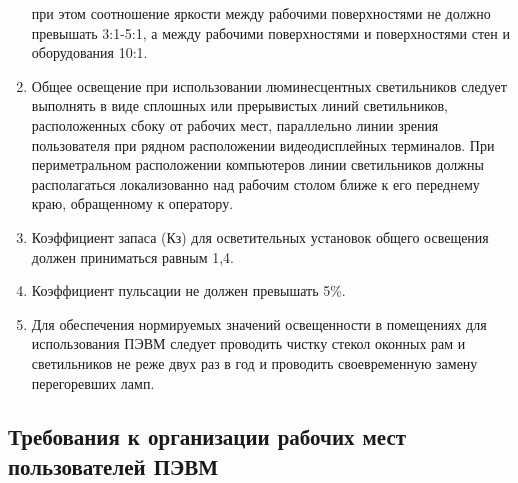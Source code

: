 \begin{enumerate}
 при этом соотношение яркости между рабочими поверхностями не должно превышать 3:1-5:1, 
 а между рабочими поверхностями и поверхностями стен и оборудования 10:1.
 \item Общее освещение при использовании люминесцентных светильников следует 
 выполнять в виде сплошных или прерывистых линий светильников, расположенных сбоку от рабочих мест, 
 параллельно линии зрения пользователя при рядном расположении видеодисплейных терминалов. 
 При периметральном расположении компьютеров линии светильников должны располагаться локализованно 
 над рабочим столом ближе к его переднему краю, обращенному к оператору.
 \item Коэффициент запаса (Кз) для осветительных установок общего освещения должен приниматься равным 1,4.
 \item Коэффициент пульсации не должен превышать 5\%.
 \item Для обеспечения нормируемых значений освещенности в помещениях для использования 
 ПЭВМ следует проводить чистку стекол оконных рам и светильников не реже двух раз в год и 
 проводить своевременную замену перегоревших ламп.
\end{enumerate}

\subsection{Требования к организации рабочих мест пользователей ПЭВМ}

